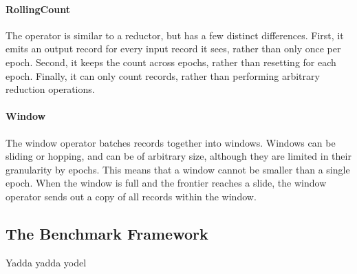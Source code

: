 \paragraph{RollingCount}
The  operator is similar to a reductor, but has a few distinct differences. First, it emits an output record for every input record it sees, rather than only once per epoch. Second, it keeps the count across epochs, rather than resetting for each epoch. Finally, it can only count records, rather than performing arbitrary reduction operations.

\paragraph{Window}
The window operator batches records together into windows. Windows can be sliding or hopping, and can be of arbitrary size, although they are limited in their granularity by epochs. This means that a window cannot be smaller than a single epoch. When the window is full and the frontier reaches a slide, the window operator sends out a copy of all records within the window.

\subsection{The Benchmark Framework}
Yadda yadda yodel

